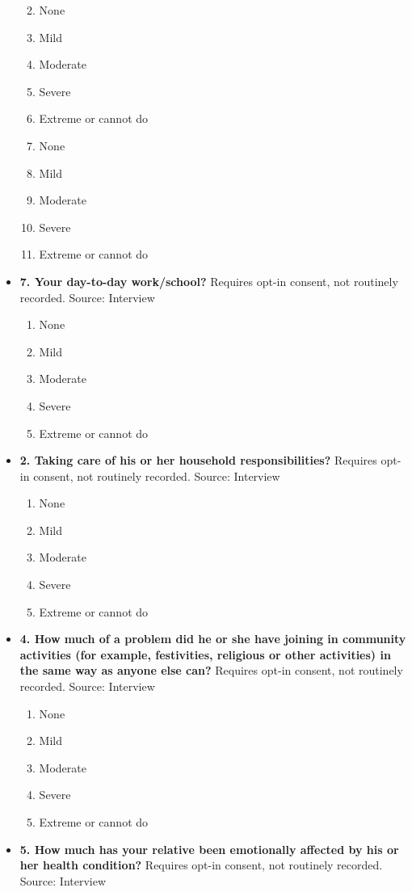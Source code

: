 \documentclass[
]{scrartcl}
\providecommand{\tightlist}{%
  \setlength{\itemsep}{0pt}\setlength{\parskip}{0pt}}\usepackage{longtable,booktabs,array}
\begin{document}
\begin{itemize}
  \begin{enumerate}
  \def\labelenumi{\arabic{enumi}.}
  \tightlist
  \item
    None
  \item
    Mild
  \item
    Moderate
  \item
    Severe
  \item
    Extreme or cannot do
  \item
    None
  \item
    Mild
  \item
    Moderate
  \item
    Severe
  \item
    Extreme or cannot do
  \end{enumerate}
\item
  \textbf{7. Your day-to-day work/school?} Requires opt-in consent, not
  routinely recorded. Source: Interview

  \begin{enumerate}
  \def\labelenumi{\arabic{enumi}.}
  \tightlist
  \item
    None
  \item
    Mild
  \item
    Moderate
  \item
    Severe
  \item
    Extreme or cannot do
  \end{enumerate}
\item
  \textbf{2. Taking care of his or her household responsibilities?}
  Requires opt-in consent, not routinely recorded. Source: Interview

  \begin{enumerate}
  \def\labelenumi{\arabic{enumi}.}
  \tightlist
  \item
    None
  \item
    Mild
  \item
    Moderate
  \item
    Severe
  \item
    Extreme or cannot do
  \end{enumerate}
\item
  \textbf{4. How much of a problem did he or she have joining in
  community activities (for example, festivities, religious or other
  activities) in the same way as anyone else can?} Requires opt-in
  consent, not routinely recorded. Source: Interview

  \begin{enumerate}
  \def\labelenumi{\arabic{enumi}.}
  \tightlist
  \item
    None
  \item
    Mild
  \item
    Moderate
  \item
    Severe
  \item
    Extreme or cannot do
  \end{enumerate}
\item
  \textbf{5. How much has your relative been emotionally affected by his
  or her health condition?} Requires opt-in consent, not routinely
  recorded. Source: Interview


\end{itemize}
\end{document}
